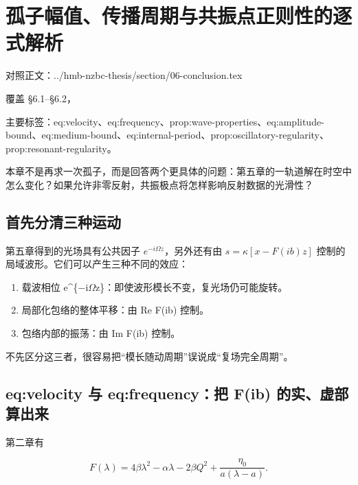 
\chapter{孤子幅值、传播周期与共振点正则性的逐式解析}

对照正文：../hmb-nzbc-thesis/section/06-conclusion.tex  \par
覆盖 §6.1–§6.2，{\sloppy \raggedright 主要标签：eq:velocity、eq:frequency、prop:wave-properties、eq:amplitude-bound、eq:medium-bound、eq:internal-period、prop:oscillatory-regularity、prop:resonant-regularity。\par}

本章不是再求一次孤子，而是回答两个更具体的问题：第五章的一轨道解在时空中怎么变化？如果允许非零反射，共振极点将怎样影响反射数据的光滑性？\par

\section{首先分清三种运动}

第五章得到的光场具有公共因子 $e^{-i\Omega{}z}$，另外还有由 $s=\kappa{}[x-F(ib)z]$ 控制的局域波形。它们可以产生三种不同的效应：\par

\begin{enumerate}[leftmargin=2em]
\item 载波相位 e\textasciicircum{}\{\ensuremath{-}i\ensuremath{\Omega}z\}：即使波形模长不变，复光场仍可能旋转。
\item 局部化包络的整体平移：由 Re F(ib) 控制。
\item 包络内部的振荡：由 Im F(ib) 控制。
\end{enumerate}

不先区分这三者，很容易把“模长随动周期”误说成“复场完全周期”。\par

\section{eq:velocity 与 eq:frequency：把 F(ib) 的实、虚部算出来}

第二章有\par

\[
F(\lambda)=4\beta\lambda^2-\alpha\lambda-2\beta Q^2+
\dfrac{\eta_0}{a(\lambda-a)}.
\]

